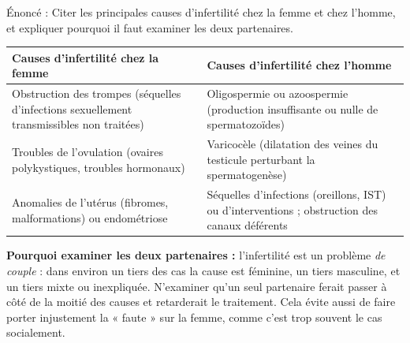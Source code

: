 \documentclass[11pt]{article}
\begin{document}
\begin{corrige}
Énoncé : Citer les principales causes d'infertilité chez la femme et chez l'homme, et expliquer pourquoi il faut examiner les deux partenaires.
\tcblower
\begin{center}
\begin{tabularx}{\linewidth}{|X|X|}
\hline
\rowcolor{popblueL} \textbf{Causes d'infertilité chez la femme} & \textbf{Causes d'infertilité chez l'homme} \\
\hline
Obstruction des trompes (séquelles d'infections sexuellement transmissibles non traitées) & Oligospermie ou azoospermie (production insuffisante ou nulle de spermatozoïdes) \\
\hline
Troubles de l'ovulation (ovaires polykystiques, troubles hormonaux) & Varicocèle (dilatation des veines du testicule perturbant la spermatogenèse) \\
\hline
Anomalies de l'utérus (fibromes, malformations) ou endométriose & Séquelles d'infections (oreillons, IST) ou d'interventions ; obstruction des canaux déférents \\
\hline
\end{tabularx}
\end{center}
\textbf{Pourquoi examiner les deux partenaires :} l'infertilité est un problème \emph{de couple} : dans environ un tiers des cas la cause est féminine, un tiers masculine, et un tiers mixte ou inexpliquée. N'examiner qu'un seul partenaire ferait passer à côté de la moitié des causes et retarderait le traitement. Cela évite aussi de faire porter injustement la « faute » sur la femme, comme c'est trop souvent le cas socialement.
\end{corrige}
\end{document}
